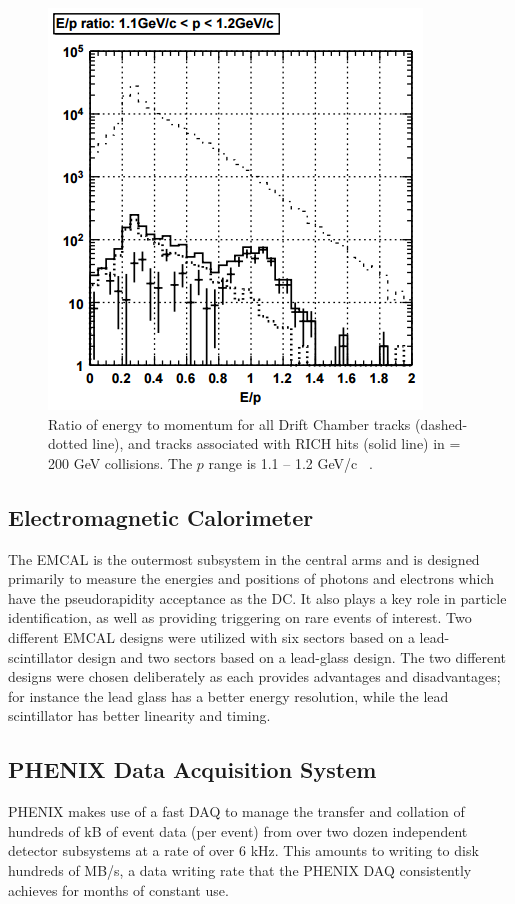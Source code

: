 \begin{figure}[!ht]
\centering
\includegraphics[width=0.55\linewidth]{figs/e_over_p_rich_discrimination.png}
\caption{Ratio of energy to momentum for all Drift Chamber tracks (dashed-dotted line), and tracks associated with RICH hits (solid line) in \auau \sqsn = 200 GeV collisions. The $p$ range is 1.1 -- 1.2 GeV/c ~\cite{Aizawa2003508}.}
\label{fig:rich_discrim_ep}
\end{figure}

\subsection{Electromagnetic Calorimeter}
The EMCAL is the outermost subsystem in the central arms and is designed primarily to measure the energies and positions of photons and electrons which have the pseudorapidity acceptance as the DC. It also plays a key role in particle identification, as well as providing triggering on rare events of interest. Two different EMCAL designs were utilized with six sectors based on a lead-scintillator design and two sectors based on a lead-glass design. The two different designs were chosen deliberately as each provides advantages and disadvantages; for instance the lead glass has a better energy resolution, while the lead scintillator has better linearity and timing.

\subsection{PHENIX Data Acquisition System}
\label{sec:PHENIX_DAQ}
PHENIX makes use of a fast DAQ to manage the transfer and collation of hundreds of kB of event data (per event) from over two dozen independent detector subsystems at a rate of over 6 kHz. This amounts to writing to disk hundreds of MB/s, a data writing rate that the PHENIX DAQ consistently achieves for months of constant use. 

